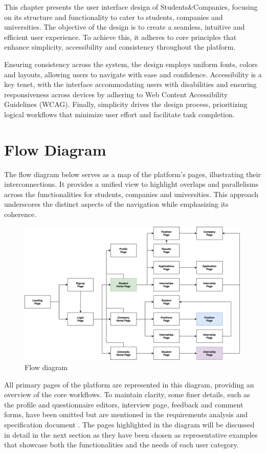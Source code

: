 This chapter presents the user interface design of Students\&Companies, focusing on its structure and functionality to cater to students, companies and universities.
The objective of the design is to create a seamless, intuitive and efficient user experience.
To achieve this, it adheres to core principles that enhance simplicity, accessibility and consistency throughout the platform.

Ensuring consistency across the system, the design employs uniform fonts, colors and layouts, allowing users to navigate with ease and confidence.
Accessibility is a key tenet, with the interface accommodating users with disabilities and ensuring responsiveness across devices by adhering to Web Content Accessibility Guidelines (WCAG).
Finally, simplicity drives the design process, prioritizing logical workflows that minimize user effort and facilitate task completion.

\section{Flow Diagram}
The flow diagram below serves as a map of the platform's pages, illustrating their interconnections.
It provides a unified view to highlight overlaps and parallelisms across the functionalities for students, companies and universities.
This approach underscores the distinct aspects of the navigation while emphasizing its coherence.

\begin{figure}[h]
    \centering
    \includegraphics[width=16cm]{images/flow-diagram.png}
    \caption{Flow diagram}
\end{figure}

All primary pages of the platform are represented in this diagram, providing an overview of the core workflows.
To maintain clarity, some finer details, such as the profile and questionnaire editors, interview page, feedback and comment forms, have been omitted but are mentioned in the requirements analysis and specification document \cite{carraracurrodossi2024}.
The pages highlighted in the diagram will be discussed in detail in the next section as they have been chosen as representative examples that showcase both the functionalities and the needs of each user category.

